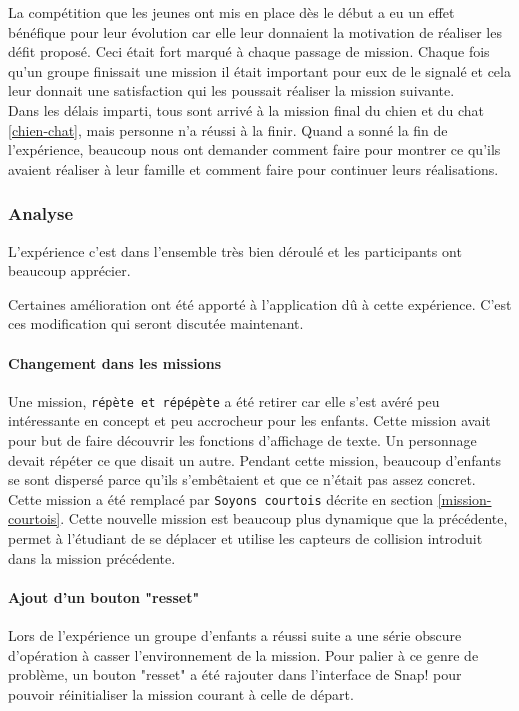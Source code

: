 La compétition que les jeunes ont mis en place dès le début a eu un effet bénéfique pour leur évolution car elle leur donnaient la motivation de réaliser les défit proposé. Ceci était fort marqué à chaque passage de mission. Chaque fois qu'un groupe finissait une mission il était important pour eux de le signalé et cela leur donnait une satisfaction qui les poussait réaliser la mission suivante.\\ %

Dans les délais imparti, tous sont arrivé à la mission final du chien et du chat \ref{chien-chat}, mais personne n'a réussi à la finir. Quand a sonné la fin de l'expérience, beaucoup nous ont demander comment faire pour montrer ce qu'ils avaient réaliser à leur famille et comment faire pour continuer leurs réalisations.

\subsubsection{Analyse}
\label{analyse-kidscode}
L'expérience c'est dans l'ensemble très bien déroulé et les participants ont beaucoup apprécier.

Certaines amélioration ont été apporté à l'application dû à cette expérience. C'est ces modification qui seront discutée maintenant.

\paragraph{Changement dans les missions}
Une mission, \texttt{répète et répépète} a été retirer car elle s'est avéré peu intéressante en concept et peu accrocheur pour les enfants. Cette mission avait pour but de faire découvrir les fonctions d'affichage de texte. Un personnage devait répéter ce que disait un autre. Pendant cette mission, beaucoup d'enfants se sont dispersé parce qu'ils s'embêtaient et que ce n'était pas assez concret. Cette mission a été remplacé par \texttt{Soyons courtois} décrite en section \ref{mission-courtois}. Cette nouvelle mission est beaucoup plus dynamique que la précédente, permet à l'étudiant de se déplacer et utilise les capteurs de collision introduit dans la mission précédente.

\paragraph{Ajout d'un bouton "resset"}
Lors de l'expérience un groupe d'enfants a réussi suite a une série obscure d'opération à casser l'environnement de la mission. Pour palier à ce genre de problème, un bouton "resset" a été rajouter dans l'interface de Snap! pour pouvoir réinitialiser la mission courant à celle de départ.

